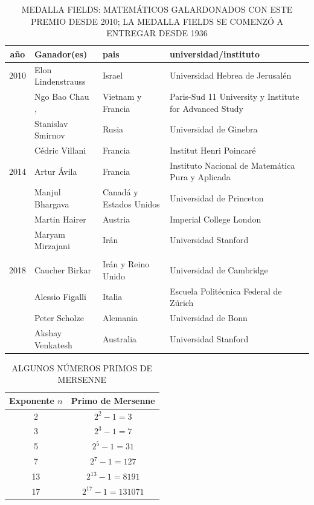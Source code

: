 \begin{table}%
\caption{\MakeUppercase{Medalla Fields: matemáticos galardonados con este premio desde 2010; la medalla Fields se comenzó a entregar desde 1936}}
\begin{center}
\begin{tabular}{cp{4cm}p{2.5cm}p{6cm}}
    \hline
    año & Ganador(es) & pais & universidad/instituto\\
    \hline 
        2010 & Elon Lindenstrauss & Israel & Universidad Hebrea de Jerusalén\\
         & Ngo Bao Chau ,  & Vietnam y Francia &Paris-Sud 11 University y Institute for Advanced Study \\
         & Stanislav Smirnov  & Rusia & Universidad de Ginebra\\
         & Cédric Villani & Francia & Institut Henri Poincaré\\
         \hline
         2014 & Artur Ávila  & Francia &Instituto Nacional de Matemática Pura y Aplicada \\
         & Manjul Bhargava  &  Canadá y Estados Unidos &Universidad de Princeton \\
         & Martin Hairer & Austria & Imperial College London\\
         & Maryam Mirzajani & Irán &Universidad Stanford \\
         \hline\\
         2018	 & Caucher Birkar & Irán y Reino Unido & Universidad de Cambridge \\
         & Alessio Figalli & Italia & Escuela Politécnica Federal de Zúrich \\
         & Peter Scholze & Alemania & Universidad de Bonn\\
         & Akshay Venkatesh  & Australia & Universidad Stanford\\
        \hline
\end{tabular}
\end{center}
\label{table:medalla_fields}
\end{table}

\clearpage

\begin{table}%
\caption{\MakeUppercase{Algunos números primos de Mersenne}}
\begin{center}
\begin{tabular}{ c|c}
    \hline
    Exponente $n$ & Primo de Mersenne \\ \hline
    2 &  $2^{2}-1=3 $ \\ \hline
    3 &  $2^{3}-1=7 $ \\ \hline
    5 &  $2^{5}-1=31 $ \\ \hline
    7 &  $2^{7}-1=127 $ \\ \hline
    13 &  $2^{13}-1=8191 $ \\ \hline
    17 &  $2^{17}-1=131071 $ \\
        \hline
\end{tabular}
\end{center}
\label{table:num_mersenne}
\end{table}


